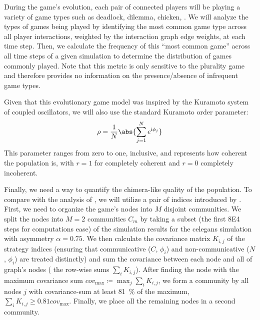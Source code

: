 \documentclass[pdflatex,lineno,referee,sn-mathphys-ay]{sn-jnl}
\begin{document}
During the game's evolution,
each pair of connected players will be playing a variety of game types
such as deadlock, dilemma, chicken, \etc{}
\citep[\cf{}][for definitions]{bruns2015names}.
We will analyze the types of games being played by
identifying the most common game type across all player interactions,
weighted by the interaction graph edge weights,
at each time step.
Then, we calculate the frequency of this ``most common game'' across
all time steps of a given simulation to determine the distribution
of games commonly played.
Note that this metric is only sensitive to the
plurality game and therefore provides no information
on the presence/absence of infrequent game types.

Given that this evolutionary game model was inspired
by the Kuramoto system of coupled oscillators,
we will also use the standard Kuramoto order parameter:
\begin{equation}
  \rho = \frac{1}{N} \abs{\sum_{j=1}^N e^{\im \phi_j}}
  \label{eq:order_parameter}
\end{equation}
This parameter ranges from zero to one, inclusive,
and represents how coherent the population is,
with $r=1$ for completely coherent and $r = 0$ completely incoherent.

Finally, we need a way to quantify
the chimera-like quality of the population.
To compare with the analysis of \citet{hizanidis2016chimera},
we will utilize a pair of indices introduced
by \citet{shanahan2010metastable}.
First, we need to organize the game's nodes
into $M$ disjoint communities.
We split the nodes into $M=2$ communities $C_m$
by taking a subset
(the first \num{8E4} steps for computations ease)
of the simulation results
for the \gls{celegans} simulation with asymmetry $\alpha = \num{0.75}$.
We then calculate the covariance matrix $K_{i,j}$ of the strategy indices
(ensuring that communicative ($C$, $\phi_i$)
and non-communicative ($N$, $\phi_i$) are treated distinctly)
and sum the covariance between each node and all of graph's nodes
(\ie{} the row-wise sums $\sum_i K_{i,j}$).
After finding the node with the maximum covariance sum
$cov_{\text{max}} \coloneqq \max_j{\sum_i K_{i,j}}$,
we form a community by all nodes $j$ with covariance-sum
at least \SI{81}{\percent} of the maximum,
$\sum_i K_{i,j} \ge \num{0.81} cov_{\text{max}}$.
Finally, we place all the remaining nodes in a second community.
\end{document}
